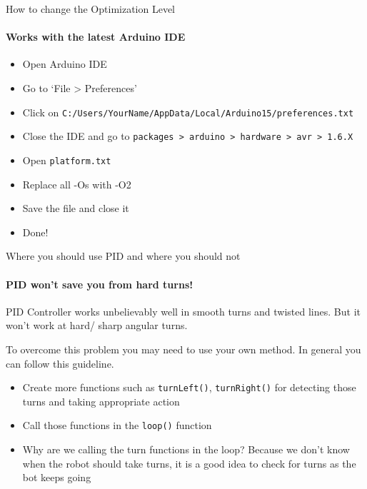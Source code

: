 \documentclass{beamer}
\begin{document}
  \begin{frame}[allowframebreaks]{How to change the Optimization Level}
  	\framesubtitle{Works with the latest Arduino IDE}
  	
  		
  		\begin{itemize}

  	
		
			\item{Open Arduino IDE}
			
			\item{Go to `File > Preferences'}
		
			\item{Click on \texttt{C:/Users/YourName/AppData/Local/Arduino15/preferences.txt}}
			
			\item{Close the IDE and go to \texttt{packages > arduino >  hardware > avr > 1.6.X}}	
				
			\item{Open \texttt{platform.txt}}
		
			\item{Replace all  \alert{-Os} with \alert{-O2}}
		
			\item{Save the file and close it}
		
			\item{Done!}
  		
  		\end{itemize}
  	
  	
  	\end{frame}
 
 
 	\begin{frame}{Where you should use PID and where you should not}
 	\framesubtitle{PID won't save you from hard turns!}
 	
 		PID Controller works unbelievably well in smooth turns and twisted lines. But it won't work at hard/ sharp angular turns. 
 		
 		\bigskip
 		
 		To overcome this problem you may need to use your own method. In general you can follow this guideline.
 		
 		\begin{itemize}
 		
			\item{Create more functions such as \texttt{turnLeft()}, \texttt{turnRight()} for detecting those turns and taking appropriate action}
			
			\item{Call those functions in the \texttt{loop()} function} 		
			
			\item{Why are we calling the turn functions in the loop? Because we don't know when the robot should take turns, it is a good idea to check for turns as the bot keeps going}
			
 		
 		\end{itemize}
 		
 	
 	\end{frame}
 	
\end{document}
